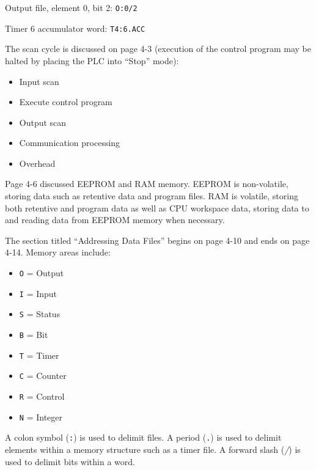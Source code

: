 Output file, element 0, bit 2: {\tt O:0/2}

\vskip 10pt

Timer 6 accumulator word: {\tt T4:6.ACC}







The scan cycle is discussed on page 4-3 (execution of the control program may be halted by placing the PLC into ``Stop'' mode):

\begin{itemize}
\item{} Input scan
\item{} Execute control program
\item{} Output scan
\item{} Communication processing
\item{} Overhead
\end{itemize}

\vskip 10pt

Page 4-6 discussed EEPROM and RAM memory.  EEPROM is non-volatile, storing data such as retentive data and program files.  RAM is volatile, storing both retentive and program data as well as CPU workspace data, storing data to and reading data from EEPROM memory when necessary.

\vskip 10pt

The section titled ``Addressing Data Files'' begins on page 4-10 and ends on page 4-14.  Memory areas include:

\begin{itemize}
\item{} {\tt O} = Output
\item{} {\tt I} = Input
\item{} {\tt S} = Status
\item{} {\tt B} = Bit
\item{} {\tt T} = Timer
\item{} {\tt C} = Counter
\item{} {\tt R} = Control
\item{} {\tt N} = Integer
\end{itemize}

A colon symbol ({\tt :}) is used to delimit files.  A period ({\tt .}) is used to delimit elements within a memory structure such as a timer file.  A forward slash ({\it /}) is used to delimit bits within a word.

\vskip 10pt

